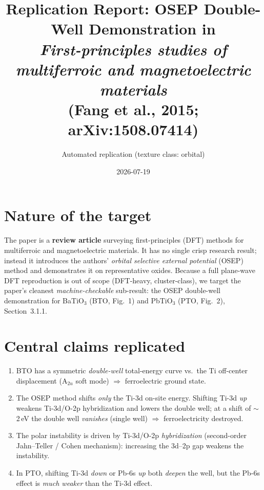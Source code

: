 \documentclass[11pt]{article}
\title{Replication Report: OSEP Double-Well Demonstration in\\
\emph{First-principles studies of multiferroic and magnetoelectric materials}\\
(Fang et al., 2015; arXiv:1508.07414)}
\author{Automated replication (texture class: orbital)}
\date{2026-07-19}
\begin{document}
\maketitle

\section{Nature of the target}
The paper is a \textbf{review article} surveying first-principles (DFT) methods
for multiferroic and magnetoelectric materials. It has no single crisp research
result; instead it introduces the authors' \emph{orbital selective external
potential} (OSEP) method and demonstrates it on representative oxides. Because a
full plane-wave DFT reproduction is out of scope (DFT-heavy, cluster-class), we
target the paper's cleanest \emph{machine-checkable} sub-result: the OSEP
double-well demonstration for BaTiO$_3$ (BTO, Fig.~1) and PbTiO$_3$ (PTO,
Fig.~2), Section~3.1.1.

\section{Central claims replicated}
\begin{enumerate}
  \item[\textbf{C1}] BTO has a symmetric \emph{double-well} total-energy curve
  vs.\ the Ti off-center displacement (A$_{2u}$ soft mode) $\Rightarrow$
  ferroelectric ground state.
  \item[\textbf{C2}] The OSEP method shifts \emph{only} the Ti-3d on-site energy.
  Shifting Ti-3d \emph{up} weakens Ti-3d/O-2p hybridization and lowers the
  double well; at a shift of $\sim$\,2\,eV the double well \emph{vanishes}
  (single well) $\Rightarrow$ ferroelectricity destroyed.
  \item[\textbf{C3}] The polar instability is driven by Ti-3d/O-2p
  \emph{hybridization} (second-order Jahn--Teller / Cohen mechanism):
  increasing the 3d--2p gap weakens the instability.
  \item[\textbf{C4}] In PTO, shifting Ti-3d \emph{down} or Pb-6s \emph{up} both
  \emph{deepen} the well, but the Pb-6s effect is \emph{much weaker} than the
  Ti-3d effect.
\end{enumerate}
\end{document}
